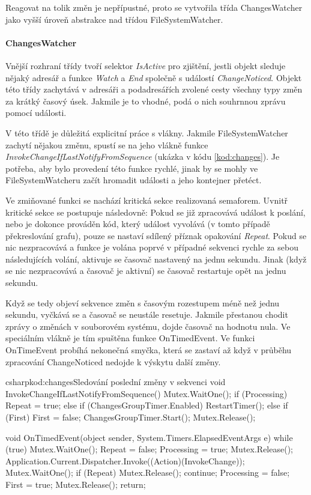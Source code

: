 \documentclass[
  biblatex,
  glossaries,
  index
]{kidiplom}
\begin{document}
Reagovat na tolik změn je nepřípustné, proto se vytvořila třída ChangesWatcher jako vyšší úroveň abstrakce nad třídou FileSystemWatcher.

\paragraph*{ChangesWatcher}
Vnější rozhraní třídy tvoří selektor {\it IsActive} pro zjištění, jestli objekt sleduje nějaký adresář a funkce {\it Watch} a {\it End} společně s událostí {\it ChangeNoticed}. Objekt této třídy zachytává v adresáři a podadresářích zvolené cesty všechny typy změn za krátký časový úsek. Jakmile je to vhodné, podá o nich souhrnnou zprávu pomocí události.

V této třídě je důležitá explicitní práce s vlákny. Jakmile FileSystemWatcher zachytí nějakou změnu, spustí se na jeho vlákně funkce {\it InvokeChangeIfLastNotifyFromSequence} (ukázka v kódu \ref{kod:changes}). Je potřeba, aby bylo provedení této funkce rychlé, jinak by se mohly ve FileSystemWatcheru začít hromadit události a jeho kontejner přetéct.

Ve zmiňované funkci se nachází kritická sekce realizovaná semaforem. Uvnitř kritické sekce se postupuje následovně: Pokud se již zpracovává  událost k poslání, nebo je dokonce prováděn kód, který událost vyvolává (v tomto případě překreslování grafu), pouze se nastaví sdílený příznak opakování {\it Repeat}. Pokud se nic nezpracovává a funkce je volána poprvé v případné sekvenci rychle za sebou následujících volání, aktivuje se časovač nastavený na jednu sekundu. Jinak (když se nic nezpracovává a časovač je aktivní) se časovač restartuje opět na jednu sekundu.

Když se tedy objeví sekvence změn s časovým rozestupem méně než jednu sekundu, vyčkává se a časovač se neustále resetuje. Jakmile přestanou chodit zprávy o změnách v souborovém systému, dojde časovač na hodnotu nula. Ve speciálním vlákně je tím spuštěna funkce OnTimedEvent.
Ve funkci OnTimeEvent probíhá nekonečná smyčka, která se zastaví až když v průběhu zpracování ChangeNoticed nedojde k výskytu další změny.

\begin{kicode}{csharp}{kod:changes}{Sledování poslední změny v sekvenci}
void InvokeChangeIfLastNotifyFromSequence()
{
    Mutex.WaitOne();
    if (Processing)
        Repeat = true;
    else if (ChangesGroupTimer.Enabled)
        RestartTimer();
    else if (First)
    {
        First = false;
        ChangesGroupTimer.Start();
    }
    Mutex.Release();
}

void OnTimedEvent(object sender, System.Timers.ElapsedEventArgs e)
{
    while (true)
    {
        Mutex.WaitOne();
        Repeat = false;
        Processing = true;
        Mutex.Release();
        Application.Current.Dispatcher.Invoke((Action)(InvokeChange));
        Mutex.WaitOne();
        if (Repeat)
        {
            Mutex.Release();
            continue;
        }
        Processing = false;
        First = true;
        Mutex.Release();
        return;
    }
}
\end{kicode}
\end{document}
